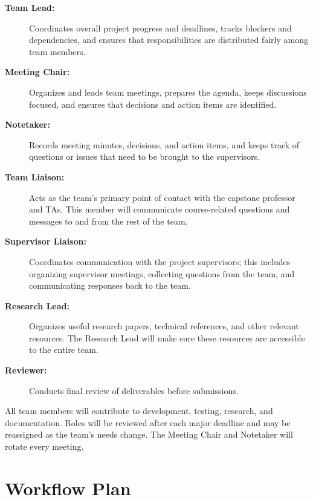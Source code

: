 \documentclass{article}
\begin{document}

\begin{description}
    \item[\textbf{Team Lead:}] Coordinates overall project progress and deadlines, tracks blockers and dependencies, and ensures that responsibilities are distributed fairly among team members.

    \item[\textbf{Meeting Chair:}] Organizes and leads team meetings, prepares the agenda, keeps discussions focused, and ensures that decisions and action items are identified.

    \item[\textbf{Notetaker:}] Records meeting minutes, decisions, and action items, and keeps track of questions or issues that need to be brought to the supervisors.

    \item[\textbf{Team Liaison:}] Acts as the team's primary point of contact with the capstone professor and TAs. This member will communicate course-related questions and messages to and from the rest of the team.

    \item[\textbf{Supervisor Liaison:}] Coordinates communication with the project supervisors; this includes organizing supervisor meetings, collecting questions from the team, and communicating responses back to the team.

    \item[\textbf{Research Lead:}] Organizes useful research papers, technical references, and other relevant resources. The Research Lead will make sure these resources are accessible to the entire team.

    \item[\textbf{Reviewer:}] Conducts final review of deliverables before submissions.
\end{description}

All team members will contribute to development, testing, research, and documentation. Roles will be reviewed after each major deadline and may be reassigned as the team's needs change. The Meeting Chair and Notetaker will rotate every meeting.

\section{Workflow Plan}
\end{document}
